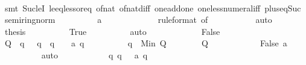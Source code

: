 \begin{isabellebody}
\ \ \ \ \ \ \ \ \isamarkupfalse%
\ {\isacharparenleft}smt\ Suc{\isacharunderscore}leI\ le{\isacharunderscore}eq{\isacharunderscore}less{\isacharunderscore}or{\isacharunderscore}eq\ of{\isacharunderscore}nat{\isacharunderscore}{}\ of{\isacharunderscore}nat{\isacharunderscore}diff\ one{\isacharunderscore}add{\isacharunderscore}one\ one{\isacharunderscore}less{\isacharunderscore}numeral{\isacharunderscore}iff\ plus{\isacharunderscore}{}{\isacharunderscore}eq{\isacharunderscore}Suc\ semiring{\isacharunderscore}norm{\isacharparenleft}{}{}{\isacharparenright}{\isacharparenright}\isanewline
\ \ \ \ \ \ \isamarkupfalse%
\ \isamarkupfalse%
\ {\isachardoublequoteopen}a\ {}{}{}{}\ {\isasymle}\ {}{\isachardoublequoteclose}\isanewline
\ \ \ \ \ \ \ \ \isamarkupfalse%
\ {\isacharasterisk}{\isacharbrackleft}rule{\isacharunderscore}format{\isacharcomma}\ of\ {}{}{}{}{\isacharbrackright}\isanewline
\ \ \ \ \ \ \ \ \isamarkupfalse%
\ auto\isanewline
\ \ \ \ \ \ \isamarkupfalse%
\ {\isacharquery}thesis\isanewline
\ \ \ \ \ \ \ \ \isamarkupfalse%
\ True\isanewline
\ \ \ \ \ \ \ \ \isamarkupfalse%
\ auto\isanewline
\ \ \ \ \isamarkupfalse%
\isanewline
\ \ \ \ \ \ \isamarkupfalse%
\ False\isanewline
\ \ \ \ \ \ \isamarkupfalse%
\ {\isacharquery}Q\ {\isacharequal}\ {\isachardoublequoteopen}{\isacharbraceleft}q{\isachardot}\ {}\ {\isasymle}\ q\ {\isasymand}\ q\ {\isasymle}\ {}{}{}{}\ {\isasymand}\ a\ q\ {\isasymnoteq}\ {}{\isacharbraceright}{\isachardoublequoteclose}\isanewline
\ \ \ \ \ \ \isamarkupfalse%
\ {\isacharquery}q\ {\isacharequal}\ {\isachardoublequoteopen}Min\ {\isacharquery}Q{\isachardoublequoteclose}\isanewline
\ \ \ \ \ \ \isamarkupfalse%
\ {\isachardoublequoteopen}{\isacharquery}Q\ {\isasymnoteq}\ {\isacharbraceleft}{\isacharbraceright}{\isachardoublequoteclose}\isanewline
\ \ \ \ \ \ \ \ \isamarkupfalse%
\ False\ {\isacharbackquoteopen}a\ {}\ {\isacharequal}\ {}{\isacharbackquoteclose}\isanewline
\ \ \ \ \ \ \ \ \isamarkupfalse%
\ auto\isanewline
\ \ \ \ \ \ \isamarkupfalse%
\ \isamarkupfalse%
\ {\isachardoublequoteopen}{}\ {\isasymle}\ {\isacharquery}q{\isachardoublequoteclose}\ {\isachardoublequoteopen}{\isacharquery}q\ {\isasymle}\ {}{}{}{}{\isachardoublequoteclose}\ {\isachardoublequoteopen}a\ {\isacharquery}q\ {\isasymnoteq}\ {}{\isachardoublequoteclose}\isanewline

\end{isabellebody}
